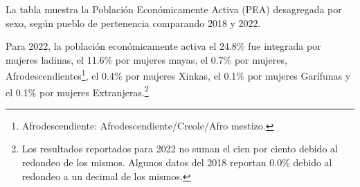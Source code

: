 La tabla muestra la Población Económicamente Activa (PEA) desagregada por sexo, según pueblo de pertenencia comparando 2018 y 2022.

Para 2022, la población económicamente activa el 24.8\% fue integrada por mujeres ladinas, el 11.6\% por mujeres mayas, el 0.7\% por mujeres, Afrodescendientes\footnote{Afrodescendiente: Afrodescendiente/Creole/Afro mestizo.}, el 0.4\% por mujeres Xinkas, el 0.1\% por mujeres Garífunas y el 0.1\% por mujeres Extranjeras.\footnote{Los resultados reportados para 2022 no suman el cien por ciento debido al redondeo de los mismos. Algunos datos del 2018 reportan 0.0\% debido al redondeo a un decimal de los mismos.}
